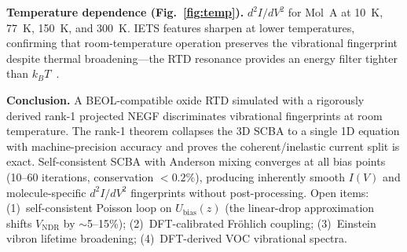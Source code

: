 \documentclass[conference]{IEEEtran}
\begin{document}
\textbf{Temperature dependence (Fig.~\ref{fig:temp}).}
$d^2I/dV^2$ for Mol~A at 10~K, 77~K, 150~K, and 300~K. IETS features
sharpen at lower temperatures, confirming that room-temperature operation
preserves the vibrational fingerprint despite thermal broadening---the RTD
resonance provides an energy filter tighter than
$k_BT$~\cite{patil2018}.

\textbf{Conclusion.} A BEOL-compatible oxide RTD simulated with a
rigorously derived rank-1 projected NEGF discriminates vibrational
fingerprints at room temperature. The rank-1 theorem collapses the 3D
SCBA to a single 1D equation with machine-precision accuracy and proves
the coherent/inelastic current split is exact. Self-consistent SCBA with
Anderson mixing converges at all bias points (10--60 iterations,
conservation $<0.2\%$), producing inherently smooth $I(V)$ and
molecule-specific $d^2I/dV^2$ fingerprints without post-processing.
Open items: (1)~self-consistent Poisson loop on $U_{\mathrm{bias}}(z)$
(the linear-drop approximation shifts $V_{\mathrm{NDR}}$ by
$\sim$5--15\%); (2)~DFT-calibrated Fröhlich coupling;
(3)~Einstein vibron lifetime broadening;
(4)~DFT-derived VOC vibrational spectra.
\end{document}
